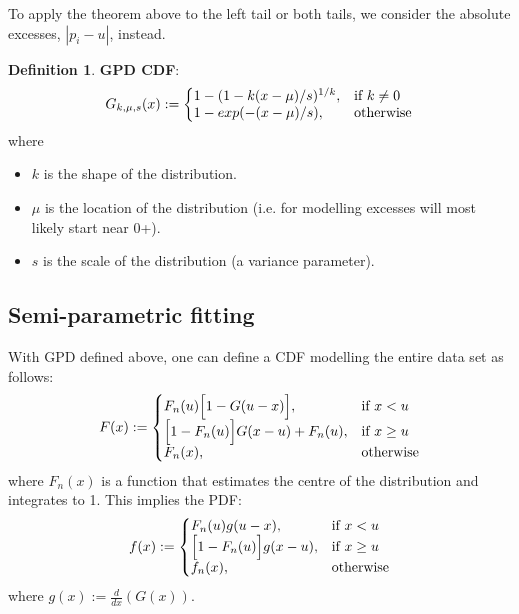 \documentclass{report}
\theoremstyle{plain}
\theoremstyle{definition}
\newtheorem{defn}[thm]{Definition} %
\begin{document}
To apply the theorem above to the left tail or both tails, we consider the absolute excesses, $|p_i - u|$, instead.

\begin{defn}
	\textbf{GPD CDF}:\\
	\begin{equation}
	G_{k,\mu,s} (x) := \left\{
	\begin{array}{@{}ll@{}}
	1 - (1 - k(x-\mu)/s)^{1/k}, & \text{if}\ k \ne 0 \\
	1 - exp(-(x-\mu)/s), & \text{otherwise}
	\end{array}
	\right.
	\end{equation} 
	where 
	\begin{itemize}
		\item $k$ is the shape of the distribution.
		\item $\mu$ is the location of the distribution (i.e. for modelling excesses will most likely start near 0+).
		\item $s$ is the scale of the distribution (a variance parameter).
	\end{itemize}
\end{defn}

\subsection{Semi-parametric fitting}

With GPD defined above, one can define a CDF modelling the entire data set as follows: 
\begin{equation}
F(x) := \left\{
\begin{array}{@{}ll@{}}
F_n(u)\Big[1-G(u-x)\Big], & \text{if}\ x < u \\
\Big[1 - F_n(u)\Big]G(x-u) + F_n(u), & \text{if}\ x \geq u \\
F_n(x), & \text{otherwise}
\end{array}
\right.
\end{equation}
where $F_n(x)$ is a function that estimates the centre of the distribution and integrates to 1. This implies the PDF:
\begin{equation}
f(x) := \left\{
\begin{array}{@{}ll@{}}
F_n(u)g(u-x), & \text{if}\ x < u \\
\Big[1 - F_n(u)\Big]g(x-u), & \text{if}\ x \geq u \\
f_n(x), & \text{otherwise}
\end{array}
\right.
\end{equation}
where $g(x) := \frac{d}{dx}(G(x))$.
\end{document}
